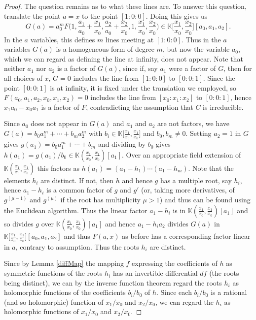 \documentclass[12pt]{amsart}
\numberwithin{equation}{section}
\theoremstyle{definition}
\newcommand{\KK}{ \ensuremath{\mathbb{K}}}
\begin{document}
\begin{proof}
The question remains as to what these lines are. To answer this question, 
translate the point $a=x$ to the point $[1:0:0]$. Doing this gives us
$$G(a)=a_0^mF\big(1,\frac{a_1}{a_0}+\frac{x_1}{x_0},\frac{a_2}{a_0}+\frac{x_2}{x_0},1,\frac{x_1}{x_0},\frac{x_2}{x_0}\big)
\in\KK\Big[\frac{x_1}{x_0},\frac{x_2}{x_0}\Big][a_0,a_1,a_2].$$
In the $a$ variables, this defines $m$ lines meeting at $[1:0:0]$.
Thus in the $a$ variables $G(a)$ 
is a homogeneous form of degree $m$, but now
the variable $a_0$, which we can regard as defining the line at infinity,
does not appear. 
Note that neither $a_1$ nor $a_2$ is a factor of $G(a)$, since 
if, say $a_1$ were a factor of $G$, then for all choices of $x$,
$G=0$ includes the line from $[1:0:0]$ to $[0:0:1]$. Since the point
$[0:0:1]$ is at infinity, it is fixed under the translation we employed,
so $F(a_0,a_1,a_2,x_0,x_1,x_2)=0$ includes the line from $[x_0:x_1:x_2]$ to $[0:0:1]$, hence
$x_1a_0-x_0a_1$ is a factor of $F$, contradicting the assumption that
$C$ is irreducible. 

Since $a_0$ does not appear in $G(a)$ and $a_1$ and $a_2$ are not factors,
we have $G(a)=b_0a_1^m+\cdots+b_ma_2^m$ with $b_i\in\KK\big[\frac{x_1}{x_0},\frac{x_1}{x_0}\big]$
and $b_0,b_m\neq0$. Setting $a_2=1$ in $G$ gives
$g(a_1)=b_0a_1^m+\cdots+b_m$ and
dividing by $b_0$ gives $h(a_1)=g(a_1)/b_0\in\KK(\frac{x_1}{x_0},\frac{x_1}{x_0})[a_1]$.
Over an appropriate field extension of $\KK(\frac{x_1}{x_0},\frac{x_1}{x_0})$ this factors
as $h(a_1)=(a_1-h_1)\cdots(a_1-h_m)$. 
Note that the elements $h_i$ are distinct. If not, then $h$ and hence $g$
has a multiple root, say $h_i$, hence $a_1-h_i$ is a common factor
of $g$ and $g'$ (or, taking more derivatives, of $g^{(\mu-1)}$ 
and $g^{(\mu)}$ if the root has multiplicity $\mu>1$)
and thus can be found using the Euclidean algorithm.
Thus the linear factor $a_1-h_i$ is in $\KK(\frac{x_1}{x_0},\frac{x_1}{x_0})[a_1]$ and so 
divides $g$ over $\KK(\frac{x_1}{x_0},\frac{x_1}{x_0})[a_1]$ and hence $a_1-h_ia_2$ divides $G(a)$ 
in $\KK\big[\frac{x_1}{x_0},\frac{x_1}{x_0}\big][a_0,a_1,a_2]$ 
and thus $F(a,x)$ as before has a corresponding factor linear in $a$, contrary to assumption.
Thus the roots $h_i$ are distinct.

Since by Lemma \ref{diffMap} 
the mapping $f$ expressing the coefficients of $h$ as symmetric functions of the roots $h_i$ has
an invertible differential $df$
(the roots being distinct), we can by the inverse function theorem \cite[p.\ 33]{FG} regard the roots
$h_i$ as holomorphic functions of the coefficients $b_i/b_0$ of $h$. Since each 
$b_i/b_0$ is a rational (and so holomorphic) function of $x_1/x_0$ and $x_2/x_0$, we can regard the
$h_i$ as holomorphic functions of $x_1/x_0$ and $x_2/x_0$.


\end{proof}
\end{document}
